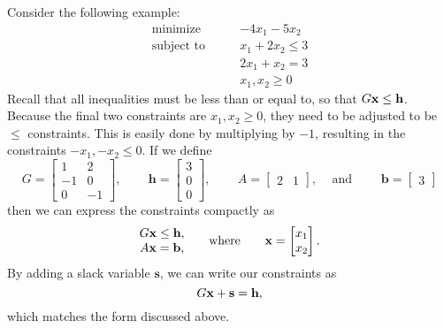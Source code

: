 Consider the following example:
\begin{align*}
\text{minimize}\qquad &-4x_1-5x_2 \\
\text{subject to}\qquad &x_1+2x_2 \leq 3 \\
	        &2x_1+x_2 = 3 \\
		&x_1, x_2 \geq 0
\end{align*}
Recall that all inequalities must be less than or equal to, so that $G\mathbf{x}\leq \mathbf{h}$.
Because the final two constraints are $x_1, x_2 \geq 0$, they need to be adjusted to be $\leq$ constraints.
This is easily done by multiplying by $-1$, resulting in the constraints $-x_1, -x_2 \leq 0$.
If we define
\[
G = \begin{bmatrix}
  1 & 2\\
  -1 & 0\\
  0 & -1
\end{bmatrix} \text{, } \qquad
\mathbf{h} = \begin{bmatrix}
  3\\
  0\\
  0
\end{bmatrix} \text{, } \qquad
A = \begin{bmatrix}
2 & 1
\end{bmatrix} \text{, } \quad \text{and } \qquad
\mathbf{b} = \begin{bmatrix}
3
\end{bmatrix}
\]
then we can express the constraints compactly as
\[
\begin{matrix}
G\mathbf{x} \leq \mathbf{h},\\
A\mathbf{x} = \mathbf{b},
\end{matrix}  \qquad \mbox{where} \qquad
\mathbf{x} = \begin{bmatrix}
  x_1\\
  x_2
\end{bmatrix}.
\]
By adding a slack variable $\mathbf{s}$, we can write our constraints as
\[
G\mathbf{x} + \mathbf{s} = \mathbf{h},
\]
which matches the form discussed above.

